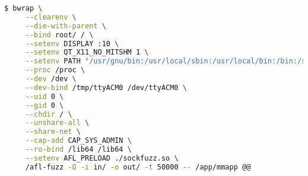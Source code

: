 
\begin{lstlisting}[language=bash, caption={Einstellen der Containerumgebung mit bwrap},label={lst:bwrap-env}]
$ bwrap \
     --clearenv \
     --die-with-parent \
     --bind root/ / \
     --setenv DISPLAY :10 \
     --setenv QT_X11_NO_MITSHM 1 \
     --setenv PATH "/usr/gnu/bin:/usr/local/sbin:/usr/local/bin:/bin:/sbin:/usr/bin:." \
     --proc /proc \
     --dev /dev \
     --dev-bind /tmp/ttyACM0 /dev/ttyACM0 \
     --uid 0 \
     --gid 0 \
     --chdir / \
     --unshare-all \
     --share-net \
     --cap-add CAP_SYS_ADMIN \
     --ro-bind /lib64 /lib64 \
     --setenv AFL_PRELOAD ./sockfuzz.so \
     /afl-fuzz -Q -i in/ -o out/ -t 50000 -- /app/mmapp @@
\end{lstlisting}